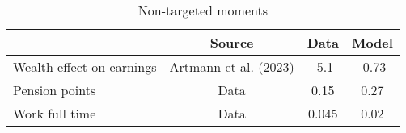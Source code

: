 \begin{table}[htbp]\caption{Non-targeted moments}\label{table:nontargeted_moments}\centering\footnotesize\begin{tabular}{lccc} \toprule  &  Source& Data & Model  \\\midrule    Wealth effect on earnings      & Artmann et al. (2023)          & -5.1 &-0.73\\ Pension points                & Data                           & 0.15 &0.27\\ Work full time              & Data                             & 0.045 &0.02\\  \bottomrule\end{tabular}\end{table}